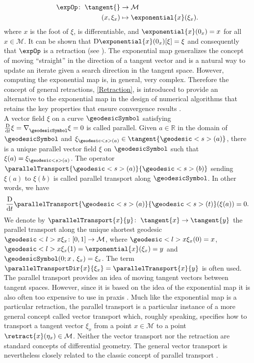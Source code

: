 \begin{align*}
    \expOp \colon \; \tangent{} & \to \mathcal{M} \\
    (x,\xi_x) & \mapsto \exponential{x}(\xi_x).
\end{align*}
where $x$ is the foot of $\xi$, is differentiable, and $\exponential{x}(0_x) = x$ for all $x \in \mathcal{M}$. It can be shown that $\mathrm{D} \exponential{x}(0_x) [\xi] = \xi$ and consequently that $\expOp$ is a retraction (see \cite[Proposition~5.4.1]{AbsilMahonySepulchre:2008}). The exponential map generalizes the concept of moving “straight” in the direction of a tangent vector and is a natural way to update an iterate given a search direction in the tangent space. However, computing the exponential map is, in general, very complex. Therefore the concept of general retractions, \cref{Retraction}, is introduced to provide an alternative to the exponential map in the design of numerical algorithms that retains the key properties that ensure convergence results \cite[p.~102-103]{AbsilMahonySepulchre:2008}. \\
A vector field $\xi$ on a curve $\geodesicSymbol$ satisfying $\frac{\mathrm{D}}{\mathrm{d}t} \xi = \nabla_{\dot{\geodesicSymbol}} \xi = 0$ is called parallel. Given $a \in \mathbb{R}$ in the domain of $\geodesicSymbol$ and $\xi_{\geodesic<s>(a)} \in \tangent{\geodesic<s>(a)}$, there is a unique parallel vector field $\xi$ on $\geodesicSymbol$ such that $\xi (a) = \xi_{\geodesic<s>(a)}$. The operator $\parallelTransport{\geodesic<s>(a)}{\geodesic<s>(b)}$ sending $\xi (a)$ to $\xi (b)$ is called parallel transport along $\geodesicSymbol$. In other words, we have
\begin{equation*}
    \frac{\mathrm{D}}{\mathrm{d}t} \parallelTransport{\geodesic<s>(a)}{\geodesic<s>(t)}(\xi(a)) = 0.
\end{equation*}
We denote by $\parallelTransport{x}{y} \colon \; \tangent{x} \to \tangent{y}$ the parallel transport along the unique shortest geodesic $\geodesic<l>{x}{\xi_x} \colon [0,1] \to \mathcal{M}$, where $\geodesic<l>{x}{\xi_x}(0) = x$, $\geodesic<l>{x}{\xi_x}(1) = \exponential{x}(\xi_x) = y$ and $\dot{\geodesicSymbol}(0; x \, , \, \xi_x) = \xi_x$. The term $\parallelTransportDir{x}{\xi_x} = \parallelTransport{x}{y}$ is often used. \\
The parallel transport provides an idea of moving tangent vectors between tangent spaces. However, since it is based on the idea of the exponential map it is also often too expensive to use in praxis \cite[p.~9]{Huang:2013}. Much like the exponential map is a particular retraction, the parallel transport is a particular instance of a more general concept called vector transport which, roughly speaking, specifies how to transport a tangent vector $\xi_x$ from a point $x \in \mathcal{M}$ to a point $\retract{x}(\eta_x) \in \mathcal{M}$. Neither the vector transport nor the retraction are standard concepts of differential geometry. The general vector transport is nevertheless closely related to the classic concept of parallel transport \cite[p.~169]{AbsilMahonySepulchre:2008}.

